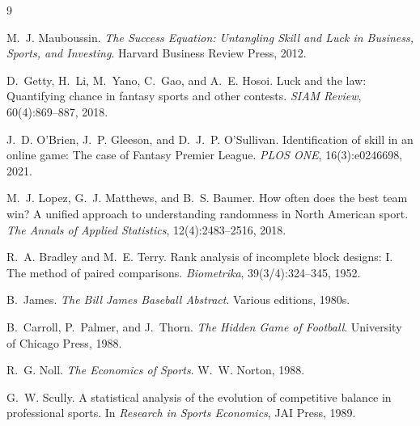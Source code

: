 \documentclass[11pt]{article}
\begin{document}
\begin{thebibliography}{9}

M.~J. Mauboussin. \emph{The Success Equation: Untangling Skill and Luck in
Business, Sports, and Investing}. Harvard Business Review Press, 2012.

D.~Getty, H.~Li, M.~Yano, C.~Gao, and A.~E. Hosoi. Luck and the law:
Quantifying chance in fantasy sports and other contests. \emph{SIAM Review},
60(4):869--887, 2018.

J.~D. O'Brien, J.~P. Gleeson, and D.~J.~P. O'Sullivan. Identification of skill
in an online game: The case of Fantasy Premier League. \emph{PLOS ONE},
16(3):e0246698, 2021.

M.~J. Lopez, G.~J. Matthews, and B.~S. Baumer. How often does the best team
win? A unified approach to understanding randomness in North American sport.
\emph{The Annals of Applied Statistics}, 12(4):2483--2516, 2018.

R.~A. Bradley and M.~E. Terry. Rank analysis of incomplete block designs: I.
The method of paired comparisons. \emph{Biometrika}, 39(3/4):324--345, 1952.

B.~James. \emph{The Bill James Baseball Abstract}. Various editions, 1980s.

B.~Carroll, P.~Palmer, and J.~Thorn. \emph{The Hidden Game of Football}.
University of Chicago Press, 1988.

R.~G. Noll. \emph{The Economics of Sports}. W.~W. Norton, 1988.

G.~W. Scully. A statistical analysis of the evolution of competitive balance
in professional sports. In \emph{Research in Sports Economics}, JAI Press,
1989.

\end{thebibliography}
\end{document}
